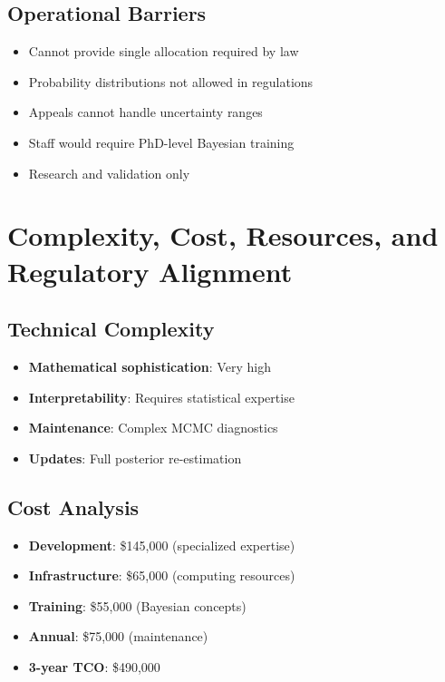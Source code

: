 \subsection{Operational Barriers}

\begin{itemize}
    \item Cannot provide single allocation required by law
    \item Probability distributions not allowed in regulations
    \item Appeals cannot handle uncertainty ranges
    \item Staff would require PhD-level Bayesian training
    \item Research and validation only
\end{itemize}

\section{Complexity, Cost, Resources, and Regulatory Alignment}

\subsection{Technical Complexity}

\begin{itemize}
    \item \textbf{Mathematical sophistication}: Very high
    \item \textbf{Interpretability}: Requires statistical expertise
    \item \textbf{Maintenance}: Complex MCMC diagnostics
    \item \textbf{Updates}: Full posterior re-estimation
\end{itemize}

\subsection{Cost Analysis}

\begin{itemize}
    \item \textbf{Development}: \$145,000 (specialized expertise)
    \item \textbf{Infrastructure}: \$65,000 (computing resources)
    \item \textbf{Training}: \$55,000 (Bayesian concepts)
    \item \textbf{Annual}: \$75,000 (maintenance)
    \item \textbf{3-year TCO}: \$490,000
\end{itemize}

